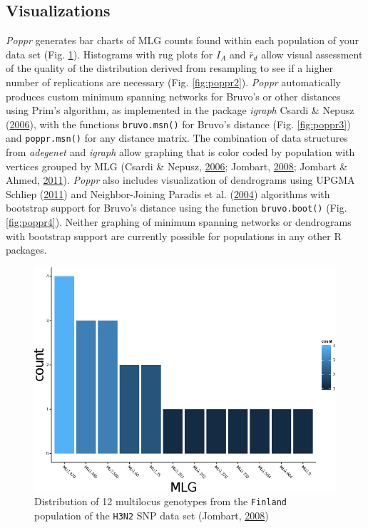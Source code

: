 \documentclass[double,11pt]{beavtex}
\begin{document}
  \subsection{Visualizations}\label{visualizations}
  
  \emph{Poppr} generates bar charts of MLG counts found within each
  population of your data set (Fig. \ref{fig:poppr1}). Histograms with rug
  plots for \(I_A\) and \(\bar{r}_d\) allow visual assessment of the
  quality of the distribution derived from resampling to see if a higher
  number of replications are necessary (Fig. \ref{fig:poppr2}).
  \emph{Poppr} automatically produces custom minimum spanning networks for
  Bruvo's or other distances using Prim's algorithm, as implemented in the
  package \emph{igraph} Csardi \& Nepusz
  (\protect\hyperlink{ref-csardi2006igraph}{2006}), with the functions
  \texttt{bruvo.msn()} for Bruvo's distance (Fig. \ref{fig:poppr3}) and
  \texttt{poppr.msn()} for any distance matrix. The combination of data
  structures from \emph{adegenet} and \emph{igraph} allow graphing that is
  color coded by population with vertices grouped by MLG (Csardi \&
  Nepusz, \protect\hyperlink{ref-csardi2006igraph}{2006}; Jombart,
  \protect\hyperlink{ref-Jombart_2008}{2008}; Jombart \& Ahmed,
  \protect\hyperlink{ref-jombart2011adegenet}{2011}). \emph{Poppr} also
  includes visualization of dendrograms using UPGMA Schliep
  (\protect\hyperlink{ref-phangorn}{2011}) and Neighbor-Joining Paradis et
  al. (\protect\hyperlink{ref-paradis2004ape}{2004}) algorithms with
  bootstrap support for Bruvo's distance using the function
  \texttt{bruvo.boot()} (Fig. \ref{fig:poppr4}). Neither graphing of
  minimum spanning networks or dendrograms with bootstrap support are
  currently possible for populations in any other R packages.
  
  \begin{figure}
  
  {\centering \includegraphics[width=0.8\linewidth]{figure/poppr/Finland} 
  
  }
  
  \caption[Distribution of 12 multilocus genotypes from the \texttt{Finland}
  population of the \texttt{H3N2} SNP data set (Jombart,
  \protect\hyperlink{ref-Jombart_2008}{2008})]{Distribution of 12 multilocus genotypes from the \texttt{Finland}
  population of the \texttt{H3N2} SNP data set (Jombart,
  \protect\hyperlink{ref-Jombart_2008}{2008})}\label{fig:poppr1}
  \end{figure}
  
\end{document}
